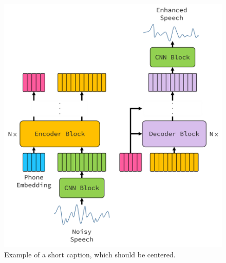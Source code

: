 \documentclass[10pt,twocolumn,letterpaper]{article}
\begin{document}
\begin{CJK}{UTF8}{bkai}
   \begin{figure}
      \begin{center}
         \includegraphics[scale=0.35]{img/architecture.png}
      \end{center}
      \caption{Example of a short caption, which should be centered.}
      \label{fig:short}
   \end{figure}


\end{CJK}
\end{document}
